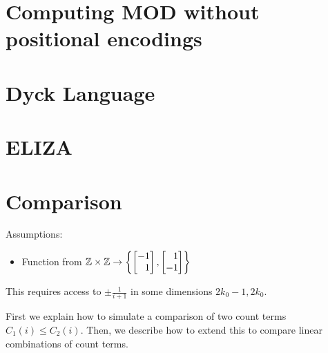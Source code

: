 \section{Computing MOD without positional encodings}


\section{Dyck Language}


\section{ELIZA}


\section{Comparison}
\label{sec:assembly_comparison}


Assumptions:
\begin{itemize}
    \item Function from $\Z\times\Z\to \left\{\begin{bmatrix}
            -1\\\phantom- 1
        \end{bmatrix}, \begin{bmatrix}
            \phantom- 1\\-1
        \end{bmatrix}\right\}$
\end{itemize}

This requires access to $\pm\frac{1}{i+1}$ in some dimensions $2k_0-1,2k_0$.

    First we explain how to simulate a comparison of two count terms $C_1(i)\leq C_2(i)$. Then, we describe how to extend this to %
    compare linear combinations of count terms.


